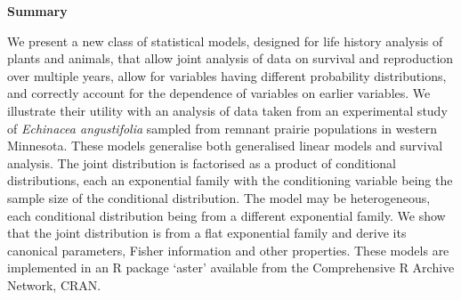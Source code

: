 
\begin{center} \bfseries Summary \end{center}

We present a new class of statistical models,
designed for life history analysis of plants and animals,
that allow joint analysis of data on survival and reproduction
over multiple years, allow for variables
having different probability distributions, and correctly
account for the dependence of variables on earlier variables.
We illustrate their utility with an analysis of data
taken from an experimental study of \emph{Echinacea angustifolia}
sampled from remnant prairie populations in western Minnesota.
These models generalise both generalised linear models and survival analysis.
The joint distribution is factorised as a product of conditional distributions,
each an exponential family with the conditioning variable being the sample
size of the conditional distribution.
The model may be heterogeneous, each conditional distribution being from
a different exponential family.
We show that the joint distribution is from a flat exponential family and
derive its canonical parameters, Fisher information and other properties.
These models are implemented in an R package `aster' available from
the Comprehensive R Archive Network, CRAN.


